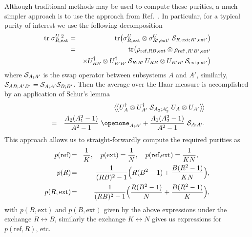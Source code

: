 \documentclass[aps,prl,amsmath,amssymb,floatfix,12pt]{revtex4}
\begin{document}
Although traditional methods \cite{Mello90} may be used to compute these
purities, a much simpler approach is to use the approach from
Ref.~. In particular, for a typical purity of interest
we use the following decomposition
\begin{eqnarray}
\text{tr}\; \sigma_{R,\text{ext}}^{U\;2}
&=& \text{tr} \bigl( \sigma_{R,\text{ext}}^U
\otimes \sigma_{R',\text{ext}'}^U \;
{\cal S}_{R,\text{ext};R',\text{ext}'}\bigr)\\
&=& \text{tr} \bigl( \rho_{\text{ref},RB,\text{ext}}\otimes
\rho_{\text{ref}',R'B',\text{ext}'}\nonumber\\
&&\times U_{RB}^\dagger\otimes U_{R'B'}^\dagger\,
{\cal S}_{R;R'}\, U_{RB}\otimes U_{R'B'}\,
{\cal S}_{\text{ext};\text{ext}'} \bigr) \nonumber
\end{eqnarray}
where ${\cal S}_{A;A'}$ is the swap operator between 
subsystems $A$ and $A'$, similarly,
${\cal S}_{AB;A'B'}={\cal S}_{A;A'}{\cal S}_{B;B'}$. Then the average
over the Haar measure is accomplished by an application of Schur's
lemma \cite{Abey06}
\begin{eqnarray}
&&\bigl\langle\!\bigl\langle U_A^\dagger\otimes U_{A'}^\dagger\;
{\cal S}_{A_2;A_2'}\; U_A \otimes U_{A'}\bigr\rangle\!\bigr\rangle
\nonumber \\
&=&\frac{A_2(A_1^2-1)}{A^2-1}\;\openone_{A;A'}
+\frac{A_1(A_2^2-1)}{A^2-1}\;{\cal S}_{A;A'}.
\end{eqnarray}
This approach allows us to straight-forwardly compute the required
purities as
\begin{eqnarray}
p(\text{ref})\!&=&\!\frac{1}{K},\quad
p(\text{ext})=\frac{1}{N},\quad
p(\text{ref,ext})=\frac{1}{KN},~~~~~ \nonumber \\
p(R)\!&=&\!\frac{1}{(RB)^2-1}
\Bigl( R(B^2-1)+\frac{B(R^2-1)}{KN}\Bigr), \\ %
p(R,\text{ext})\!&=&\!\frac{1}{(RB)^2-1}
\Bigl( \frac{R(B^2-1)}{N}+\frac{B(R^2-1)}{K}\Bigr), \nonumber
\end{eqnarray}
with $p(B,\text{ext})$ and $p(B,\text{ext})$ given by the
above expressions under the exchange $R\leftrightarrow B$, similarly
the exchange $K\leftrightarrow N$ gives us expressions for
$p(\text{ref},R)$, etc.
\end{document}
